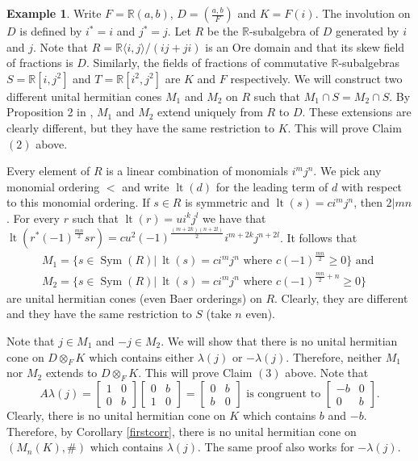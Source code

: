 \documentclass[12pt,reqno]{amsart}
\theoremstyle{definition}
\newtheorem{ex}{Example}
\providecommand{\RR}{\mathbb{R}}
\DeclareMathOperator{\sym}{Sym}
\DeclareMathOperator{\lt}{lt}
\begin{document}
\begin{ex}
\label{diffex}
Write $F = \RR(a,b)$, $D = \left( \frac{a,b}{F} \right)$ and $K=F(i)$. 
The involution on $D$ is defined by $i^\ast=i$ and $j^\ast =j$.
Let $R$ be the $\RR$-subalgebra of $D$ generated by $i$ and $j$.
Note that $R=\RR \langle i,j \rangle/(ij+ji)$ is an Ore domain
and that its skew field of fractions is $D$. Similarly, the fields of fractions 
of commutative $\RR$-subalgebras $S=\RR[i,j^2]$ and $T=\RR[i^2,j^2]$
are $K$ and $F$ respectively. We will construct two different unital hermitian cones 
$M_1$ and $M_2$ on $R$ such that $M_1 \cap S=M_2 \cap S$. 
By Proposition 2 in \cite{ci2}, $M_1$ and $M_2$ extend uniquely from $R$ to $D$.
These extensions are clearly different, but they have the same restriction to $K$. 
This will prove Claim $(2)$ above.

Every element of $R$ is a linear combination of monomials $i^m j^n$. 
We pick any monomial ordering $<$ and write $\lt(d)$
for the leading term of $d$ with respect to this monomial ordering.
If $s \in R$ is symmetric and $\lt(s)=c i^m j^n$, then $2|mn$.
For every $r$ such that $\lt(r)=u i^k j^l$ we have that
$\lt(r^\ast (-1)^{\frac{mn}{2}} s r)= cu^2 (-1)^{\frac{(m+2k)(n+2l)}{2}} i^{m+2k}j^{n+2l}$.
It follows that 
\[\begin{array}{c}
M_1 = \{s \in \sym(R) \vert \ \lt(s)=ci^m j^n \text{ where } c(-1)^{\frac{mn}{2}} \ge 0\} \text{ and }\\
M_2 = \{s \in \sym(R) \vert \ \lt(s)=ci^m j^n \text{ where } c(-1)^{\frac{mn}{2}+n} \ge 0\}
\end{array}\]
are unital hermitian cones (even Baer orderings) on $R$. Clearly, they are different and they 
have the same restriction to $S$ (take $n$ even).

Note that $j \in M_1$ and $-j \in M_2$.
We will show that there is no unital hermitian cone on $D \otimes_F K$ which contains either 
$\lambda(j)$ or $-\lambda(j)$. Therefore, neither $M_1$ nor $M_2$ extends to $D \otimes_F K$.
This will prove Claim $(3)$ above. Note that 
\[
A \lambda(j) = \left[ \begin{array}{cc} 1 & 0 \\ 0 & b \end{array} \right]
\left[ \begin{array}{cc} 0 & b \\ 1 & 0 \end{array} \right] =
\left[ \begin{array}{cc} 0 & b \\ b & 0 \end{array} \right] \mbox{ is congruent to } 
\left[ \begin{array}{cc} -b & 0 \\ 0 & b \end{array} \right].
\]
Clearly, there is no unital hermitian cone on $K$ which contains $b$ and $-b$. 
Therefore, by Corollary \ref{firstcorr}, there is no unital hermitian cone on 
$(M_n(K),\#)$ which contains $\lambda(j)$. The same proof also works for $-\lambda(j)$.
\end{ex}
\end{document}
